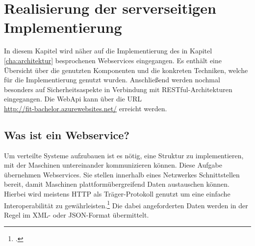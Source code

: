 \chapter{Realisierung der serverseitigen Implementierung}
\label{cha:server-impl}
In diesem Kapitel wird näher auf die Implementierung des in Kapitel \ref{cha:architektur} besprochenen Webservices eingegangen. Es enthält eine Übersicht über die genutzten Komponenten und die konkreten Techniken, welche für die Implementierung genutzt wurden. Anschließend werden nochmal besonders auf Sicherheitsaspekte in Verbindung mit RESTful-Architekturen eingegangen. Die WebApi kann über die URL\\ \href{http://fit-bachelor.azurewebsites.net/}{http://fit-bachelor.azurewebsites.net/} erreicht werden. 
\section{Was ist ein Webservice?}
\label{sec:definition-webservice}
Um verteilte Systeme aufzubauen ist es nötig, eine Struktur zu implementieren, mit der Maschinen untereinander kommunizieren können. Diese Aufgabe übernehmen Webservices. Sie stellen innerhalb eines Netzwerkes Schnittstellen bereit, damit Maschinen plattformübergreifend Daten austauschen können. Hierbei wird meistens HTTP als Träger-Protokoll genutzt um eine einfache Interoperabilität zu gewährleisten.\footcite{Definition-Webservice} Die dabei angeforderten Daten werden in der Regel im XML- oder JSON-Format übermittelt. 
